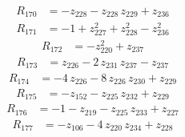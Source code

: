 \begin{equation*}\begin{aligned}
R_{170}&=-z_{228} -z_{228}\,z_{229} +z_{236}
\end{aligned}\end{equation*}
\begin{equation*}\begin{aligned}
R_{171}&=-1 +z_{227}^{2} +z_{228}^{2} -z_{236}^{2}
\end{aligned}\end{equation*}
\begin{equation*}\begin{aligned}
R_{172}&=-z_{220}^{2} +z_{237}
\end{aligned}\end{equation*}
\begin{equation*}\begin{aligned}
R_{173}&=z_{226} -2\,z_{231}\,z_{237} -z_{237}
\end{aligned}\end{equation*}
\begin{equation*}\begin{aligned}
R_{174}&=-4\,z_{226} -8\,z_{226}\,z_{230} +z_{229}
\end{aligned}\end{equation*}
\begin{equation*}\begin{aligned}
R_{175}&=-z_{152} -z_{225}\,z_{232} +z_{229}
\end{aligned}\end{equation*}
\begin{equation*}\begin{aligned}
R_{176}&=-1 -z_{219} -z_{225}\,z_{233} +z_{227}
\end{aligned}\end{equation*}
\begin{equation*}\begin{aligned}
R_{177}&=-z_{106} -4\,z_{220}\,z_{234} +z_{228}
\end{aligned}\end{equation*}
